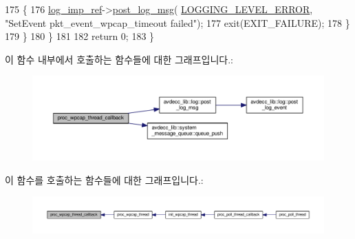 \begin{DoxyCode}
175             \{
176                 \hyperlink{namespaceavdecc__lib_acbe3e2a96ae6524943ca532c87a28529}{log\_imp\_ref}->\hyperlink{classavdecc__lib_1_1log_a68139a6297697e4ccebf36ccfd02e44a}{post\_log\_msg}(
      \hyperlink{namespaceavdecc__lib_a501055c431e6872ef46f252ad13f85cdaf2c4481208273451a6f5c7bb9770ec8a}{LOGGING\_LEVEL\_ERROR}, \textcolor{stringliteral}{"SetEvent pkt\_event\_wpcap\_timeout failed"});
177                 exit(EXIT\_FAILURE);
178             \}
179         \}
180     \}
181 
182     \textcolor{keywordflow}{return} 0;
183 \}
\end{DoxyCode}


이 함수 내부에서 호출하는 함수들에 대한 그래프입니다.\+:
\nopagebreak
\begin{figure}[H]
\begin{center}
\leavevmode
\includegraphics[width=350pt]{classavdecc__lib_1_1system__layer2__multithreaded__callback_a54a695e290c1dcaabec7be12625b3b81_cgraph}
\end{center}
\end{figure}




이 함수를 호출하는 함수들에 대한 그래프입니다.\+:
\nopagebreak
\begin{figure}[H]
\begin{center}
\leavevmode
\includegraphics[width=350pt]{classavdecc__lib_1_1system__layer2__multithreaded__callback_a54a695e290c1dcaabec7be12625b3b81_icgraph}
\end{center}
\end{figure}


